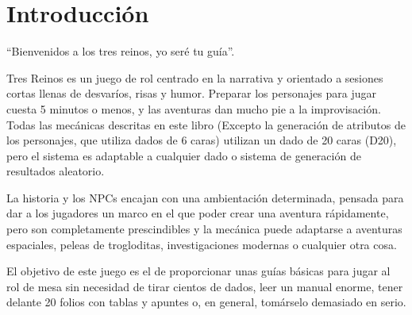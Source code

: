 \chapter*{Introducción}
\thispagestyle{empty}

``Bienvenidos a los tres reinos, yo seré tu guía''.
\par 
Tres Reinos es un juego de rol centrado en la narrativa y orientado a sesiones cortas llenas de desvaríos, risas y humor. Preparar los personajes para jugar cuesta 5 minutos o menos, y las aventuras dan mucho pie a la improvisación. Todas las mecánicas descritas en este libro (Excepto la generación de atributos de los personajes, que utiliza dados de 6 caras) utilizan un dado de 20 caras (D20), pero el sistema es adaptable a cualquier dado o sistema de generación de resultados aleatorio.
\par 
La historia y los NPCs encajan con una ambientación determinada, pensada para dar a los jugadores un marco en el que poder crear una aventura rápidamente, pero son completamente prescindibles y la mecánica puede adaptarse a aventuras espaciales, peleas de trogloditas, investigaciones modernas o cualquier otra cosa. 
\par 
El objetivo de este juego es el de proporcionar unas guías básicas para jugar al rol de mesa sin necesidad de tirar cientos de dados, leer un manual enorme, tener delante 20 folios con tablas y apuntes o, en general, tomárselo demasiado en serio.
